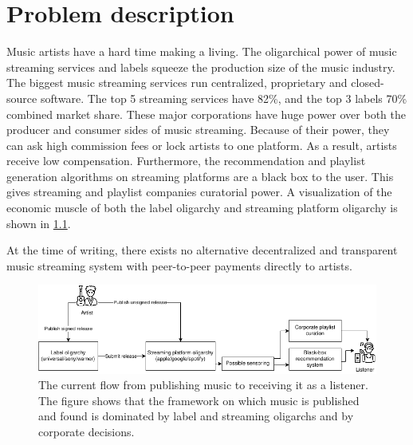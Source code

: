\chapter{\label{chap:related-work}Problem description}
Music artists have a hard time making a living. The oligarchical power of music streaming services and labels squeeze the production size of the music industry. The biggest music streaming services run centralized, proprietary and closed-source software. The top 5 streaming services have 82\%, and the top 3 labels 70\% combined market share. These major corporations have huge power over both the producer and consumer sides of music streaming. Because of their power, they can ask high commission fees or lock artists to one platform. As a result, artists receive low compensation. Furthermore, the recommendation and playlist generation algorithms on streaming platforms are a black box to the user. This gives streaming and playlist companies curatorial power. A visualization of the economic muscle of both the label oligarchy and streaming platform oligarchy is shown in \ref{fig:current-music-publishing-situation}.

At the time of writing, there exists no alternative decentralized and transparent music streaming system with peer-to-peer payments directly to artists. 

\begin{figure}
    \centering
    \includegraphics[width=1\linewidth]{problem-description/current-music-publishing-situation-2.png}
    \caption{The current flow from publishing music to receiving it as a listener. The figure shows that the framework on which music is published and found is dominated by label and streaming oligarchs and by corporate decisions.}
    \label{fig:current-music-publishing-situation}
\end{figure}

